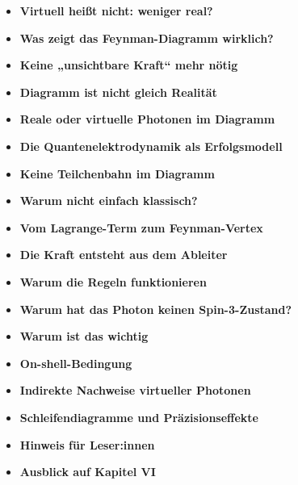 \medskip
\begin{tcolorbox}[title=didaktische Boxen, didaktikbox]
	\begin{itemize}
		\item \textbf{Virtuell heißt nicht: weniger real?} \dotfill \pageref{box:virtuell-denkfehler}
		\item \textbf{Was zeigt das Feynman-Diagramm wirklich?} \dotfill \pageref{box:Was zeigt das Feynman-Diagramm wirklich}
			\item \textbf{Keine „unsichtbare Kraft“ mehr nötig} \dotfill \pageref{box:unsichtbare Kraft}
		\item \textbf{Diagramm ist nicht gleich Realität} \dotfill \pageref{boxx:Diagramm ist nicht gleich realität}
		\item \textbf{Reale oder virtuelle Photonen  im Diagramm} \dotfill \pageref{box:Reale oder virtuelle Photonen}
		\item \textbf{Die Quantenelektrodynamik  als Erfolgsmodell} \dotfill \pageref{box:Die Quantenelekrodynamik}
		
		
		\item \textbf{Keine Teilchenbahn im Diagramm} \dotfill \pageref{box: Keine Teilchenbahn im Diagramm}
		
		\item \textbf{Warum nicht einfach klassisch?} \dotfill \pageref{box:Warum nicht einfach klassisch?}
		\item \textbf{Vom Lagrange-Term zum Feynman-Vertex} \dotfill \pageref{box:Vom Lagrange-Term zum Feynmann-Vertax}
		
		\item \textbf{Die Kraft entsteht aus dem Ableiter} \dotfill \pageref{box:Die Kraft entsteht aus dem Ableiter}
		\item \textbf{Warum die Regeln funktionieren} \dotfill \pageref{box:Warum die Regeln funktionieren}
		
		\item \textbf{Warum hat das Photon keinen  Spin-3-Zustand?} \dotfill \pageref{box:Warum hat das Photon keinen  Spin-3-Zustand}
        	\item \textbf{Warum ist das wichtig} \dotfill \pageref{box:Warum ist wichtig}
	\end{itemize}
\end{tcolorbox}

\medskip
\begin{tcolorbox}[title=Hinweisboxen, hinweisbox]
	\begin{itemize}
		\item \textbf{On-shell-Bedingung} \dotfill \pageref{box:On-shell-Bedingung}
		\item \textbf{Indirekte Nachweise virtueller Photonen} \dotfill \pageref{box:Nachweis virtueller Photonen}
		\item \textbf{Schleifendiagramme und Präzisionseffekte} \dotfill \pageref{box:Schleifendiagramme}
		\item \textbf{Hinweis für Leser:innen} \dotfill \pageref{box:Hinweis füe Leser}
		\item \textbf{Ausblick auf Kapitel VI} \dotfill \pageref{box:Ausblick auf Kapitel 6}
	\end{itemize}
\end{tcolorbox}
\medskip

